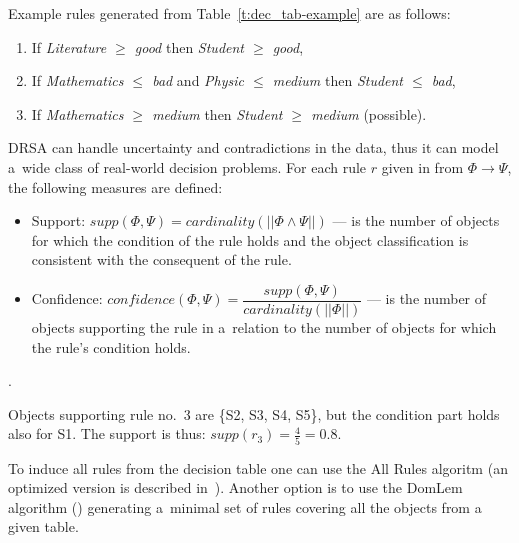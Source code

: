 Example rules generated from Table~\ref{t:dec_tab-example} are as follows:
\begin{enumerate}
\item If \textit{Literature $\ge$ good} then \textit{Student $\ge$ good},
\item If \textit{Mathematics $\le$ bad} and \textit{Physic $\le$ medium} then
  \textit{Student $\le$ bad},
\item If \textit{Mathematics $\ge$ medium} then \textit{Student $\ge$ medium}
  (possible).
\end{enumerate}

DRSA can handle uncertainty and contradictions in the data, thus it can model
a~wide class of real-world decision problems. For each rule $r$ given in from
$\Phi \to \Psi$, the following measures are defined:
\begin{itemize}
\item Support: $\textit{supp}(\Phi, \Psi) = \textit{cardinality}(||\Phi \land
  \Psi||)$ --- is the number of objects for which the condition of the rule
  holds and the object classification is consistent with the consequent of the
  rule.
\item Confidence: $\textit{confidence}(\Phi, \Psi) =
  \dfrac{\textit{supp}(\Phi, \Psi)}{\textit{cardinality}(||\Phi||)}$ --- is
  the number of objects supporting the rule in a~relation to the number of
  objects for which the rule's condition holds.
\end{itemize}.

Objects supporting rule no.~3  are \{S2, S3, S4, S5\}, but the condition part
holds also for S1. The support is thus: $\textit{supp}(r_3) = \frac{4}{5} = 0.8$.

To induce all rules from the decision table one can use the All Rules algoritm
(an optimized version is described in~\cite{Zur01}). Another option is to use
the DomLem algorithm (\cite{GMS+01}) generating a~minimal set of rules
covering all the objects from a given table.


